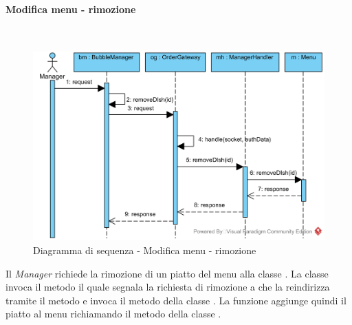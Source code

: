 \paragraph{Modifica menu - rimozione}\mbox{} \\
\nopagebreak
\begin{figure}[H]
	\centering
	\includegraphics[width=15cm]{./diagrammi/sequenza/modifica_menu_delete.png}
	\caption{Diagramma di sequenza - Modifica menu - rimozione}
\end{figure}
Il \textit{Manager} richiede la rimozione di un piatto del menu alla classe . La classe invoca il metodo  il quale segnala la richiesta di rimozione a  che la reindirizza tramite il metodo  e invoca il metodo  della classe . La funzione aggiunge quindi il piatto al menu richiamando il metodo  della classe .

